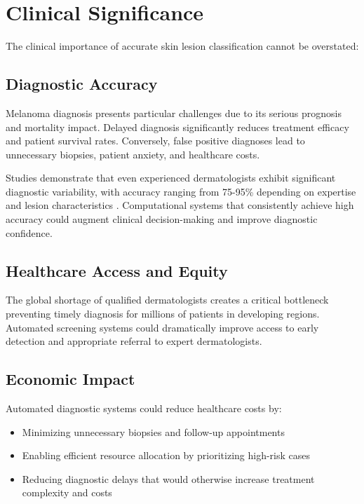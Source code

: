 \section{Clinical Significance}

The clinical importance of accurate skin lesion classification cannot be overstated:

\subsection{Diagnostic Accuracy}

Melanoma diagnosis presents particular challenges due to its serious prognosis and mortality impact. Delayed diagnosis significantly reduces treatment efficacy and patient survival rates. Conversely, false positive diagnoses lead to unnecessary biopsies, patient anxiety, and healthcare costs.

Studies demonstrate that even experienced dermatologists exhibit significant diagnostic variability, with accuracy ranging from 75-95\% depending on expertise and lesion characteristics \cite{esteva2019dermatologist}. Computational systems that consistently achieve high accuracy could augment clinical decision-making and improve diagnostic confidence.

\subsection{Healthcare Access and Equity}

The global shortage of qualified dermatologists creates a critical bottleneck preventing timely diagnosis for millions of patients in developing regions. Automated screening systems could dramatically improve access to early detection and appropriate referral to expert dermatologists.

\subsection{Economic Impact}

Automated diagnostic systems could reduce healthcare costs by:
\begin{itemize}
    \item Minimizing unnecessary biopsies and follow-up appointments
    \item Enabling efficient resource allocation by prioritizing high-risk cases
    \item Reducing diagnostic delays that would otherwise increase treatment complexity and costs
\end{itemize}

